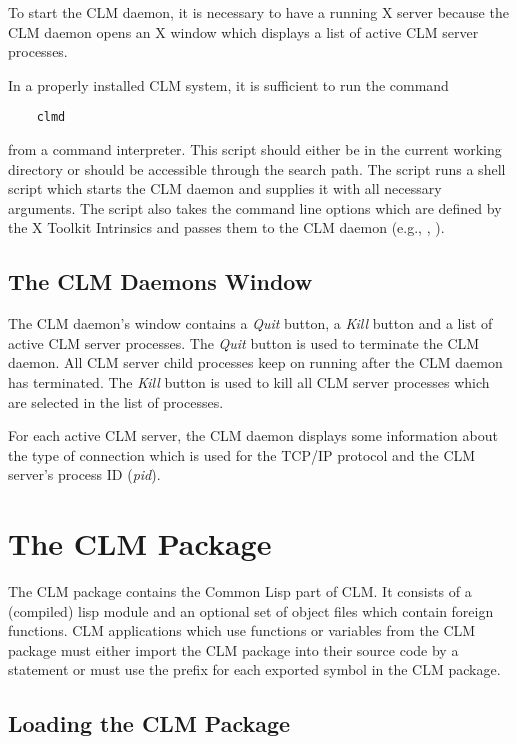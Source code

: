 To start the CLM daemon, it is necessary to have a running X server because
the CLM daemon opens an X window which displays a list of active CLM server
processes.

\pagebreak
In a properly installed CLM system, it is sufficient to run the command
\begin{flushleft}
{\tt\ \ \ \ clmd}
\end{flushleft}
from a command interpreter.  This script should either be in the current working
directory or should be accessible through the search path.  The script runs a
shell script which starts the CLM daemon and supplies it with all necessary
arguments.  The  script also takes the command line options
which are defined by the X Toolkit Intrinsics and passes them to the CLM
daemon (e.g., , ). 

\subsection{The CLM Daemons Window}

The CLM daemon's window contains a {\it Quit} button, a {\it Kill} button and
a list of active CLM server processes.  The {\it Quit} button is used to 
terminate the CLM daemon.  All CLM server child processes keep on running
after the CLM daemon has terminated. The {\it Kill} button is used to kill
all CLM server processes which are selected in the list of processes.

For each active CLM server, the CLM daemon displays some information about
the type of connection which is used for the TCP/IP protocol and the CLM
server's process ID ({\em pid}). 

\section{The CLM Package}

The CLM package contains the Common Lisp part of CLM. It consists of a
(compiled) lisp module and an optional set of object files which contain 
foreign functions. CLM applications which use functions or variables from
the CLM package must either import the CLM package into their source code
by a  statement or must use the prefix 
for each exported symbol in the CLM package.

\subsection{Loading the CLM Package}

